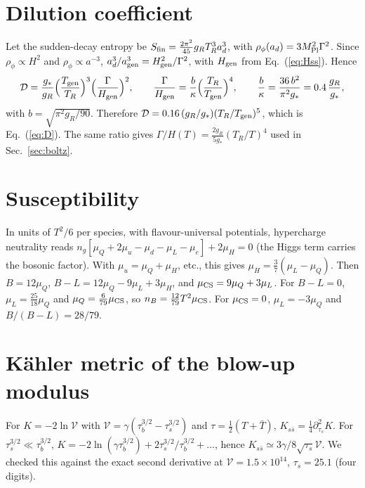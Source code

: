 \documentclass[11pt]{article}
\newcommand{\Mpl}{M_{\rm Pl}}
\newcommand{\vol}{\mathcal{V}}
\begin{document}
\appendix
\section{Dilution coefficient}
Let the sudden-decay entropy be $S_{\rm fin}=\tfrac{2\pi^2}{45}g_RT_R^3a_d^3$, with $\rho_\phi(a_d)=3\Mpl^2\Gamma^2$. Since $\rho_\phi\propto H^2$ and $\rho_\phi\propto a^{-3}$, $a_d^3/a_{\rm gen}^3=H_{\rm gen}^2/\Gamma^2$, with $H_{\rm gen}$ from Eq.~(\ref{eq:Hss}). Hence
\begin{equation}
\mathcal D=\frac{g_*}{g_R}\Big(\frac{T_{\rm gen}}{T_R}\Big)^3\Big(\frac{\Gamma}{H_{\rm gen}}\Big)^2,\qquad
\frac{\Gamma}{H_{\rm gen}}=\frac{b}{\kappa}\Big(\frac{T_R}{T_{\rm gen}}\Big)^4,\qquad \frac b\kappa=\frac{36\,b^2}{\pi^2g_*}=0.4\,\frac{g_R}{g_*},
\end{equation}
with $b=\sqrt{\pi^2g_R/90}$. Therefore $\mathcal D=0.16\,(g_R/g_*)(T_R/T_{\rm gen})^5$, which is Eq.~(\ref{eq:D}). The same ratio gives $\Gamma/H(T)=\tfrac{2g_R}{5g_*}(T_R/T)^4$ used in Sec.~\ref{sec:boltz}.

\section{Susceptibility}
In units of $T^2/6$ per species, with flavour-universal potentials, hypercharge neutrality reads $n_g[\mu_Q+2\mu_u-\mu_d-\mu_L-\mu_e]+2\mu_H=0$ (the Higgs term carries the bosonic factor). With $\mu_u=\mu_Q+\mu_H$, etc., this gives $\mu_H=\tfrac37(\mu_L-\mu_Q)$. Then $B=12\mu_Q$, $B-L=12\mu_Q-9\mu_L+3\mu_H$, and $\mu_{\rm CS}=9\mu_Q+3\mu_L$. For $B-L=0$, $\mu_L=\tfrac{25}{18}\mu_Q$ and $\mu_Q=\tfrac{6}{79}\mu_{\rm CS}$, so $n_B=\tfrac{12}{79}T^2\mu_{\rm CS}$. For $\mu_{\rm CS}=0$, $\mu_L=-3\mu_Q$ and $B/(B-L)=28/79$.

\section{K\"ahler metric of the blow-up modulus}
For $K=-2\ln\vol$ with $\vol=\gamma(\tau_b^{3/2}-\tau_s^{3/2})$ and $\tau=\tfrac12(T+\bar T)$, $K_{s\bar s}=\tfrac14\partial_{\tau_s}^2K$. For $\tau_s^{3/2}\ll\tau_b^{3/2}$, $K=-2\ln(\gamma\tau_b^{3/2})+2\tau_s^{3/2}/\tau_b^{3/2}+\dots$, hence $K_{s\bar s}\simeq3\gamma/8\sqrt{\tau_s}\vol$. We checked this against the exact second derivative at $\vol=1.5\times10^{14}$, $\tau_s=25.1$ (four digits).
\end{document}
